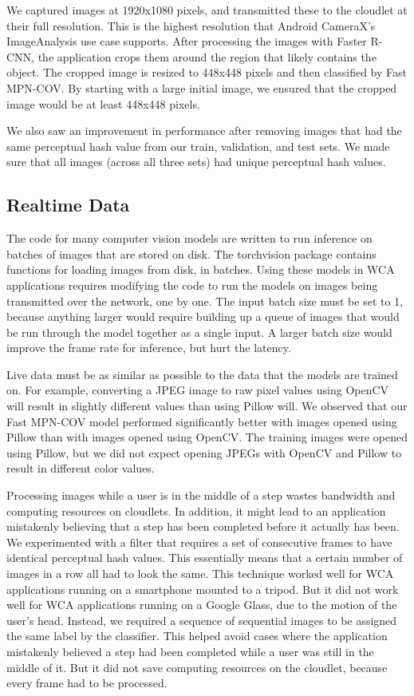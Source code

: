 We captured images at 1920x1080 pixels, and transmitted these to the cloudlet at
their full resolution.
This is the highest resolution that Android CameraX's ImageAnalysis use case
supports.
After processing the images with Faster R-CNN, the application crops them around
the region that likely contains the object.
The cropped image is resized to 448x448 pixels and then classified by Fast
MPN-COV.
By starting with a large initial image, we ensured that the cropped image would
be at least 448x448 pixels.

We also saw an improvement in performance after removing images that had the
same perceptual hash value from our train, validation, and test sets. We made
sure that all images (across all three sets) had unique perceptual hash values.

\subsection{Realtime Data}

The code for many computer vision models are written to run inference on batches
of images that are stored on disk. The torchvision package contains functions
for loading images from disk, in batches. Using these models in WCA applications
requires modifying the code to run the models on images being transmitted over
the network, one by one. The input batch size must be set to 1, because anything
larger would require building up a queue of images that would be run through the
model together as a single input. A larger batch size would improve the
frame rate for inference, but hurt the latency.

Live data must be as similar as possible to the data that the models are trained
on. For example, converting a
JPEG image to raw pixel values using OpenCV will result in slightly different
values than using Pillow will. We observed that our Fast MPN-COV model performed
significantly better with images opened using Pillow than with images opened
using OpenCV. The training images were opened using Pillow, but we did not
expect opening JPEGs with OpenCV and Pillow to result in different color values.

Processing images while a user is in the middle of a step wastes bandwidth and
computing resources on cloudlets.
In addition, it might lead to an application mistakenly
believing that a step has been completed before it actually has been.
We experimented with a filter that requires a set of consecutive frames to have
identical perceptual hash values.
This essentially means that a certain number of images in a row all had to look
the same.
This technique worked well for WCA applications running on a smartphone mounted
to a tripod.
But it did not work well for WCA applications running on a Google Glass, due to
the motion of the user's head.
Instead, we required a sequence of sequential images to be assigned the same
label by the classifier.
This helped avoid cases where the application mistakenly believed a step had
been completed while a user was still in the middle of it.
But it did not save computing resources on the cloudlet, because every frame had
to be processed.
